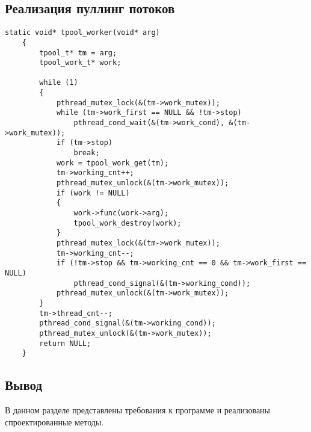 \subsection{Реализация пуллинг потоков}

\begin{lstlisting}[label=dbcreate, caption=Сокета poll]
    static void* tpool_worker(void* arg)
    {
        tpool_t* tm = arg;
        tpool_work_t* work;
    
        while (1)
        {
            pthread_mutex_lock(&(tm->work_mutex));
            while (tm->work_first == NULL && !tm->stop)
                pthread_cond_wait(&(tm->work_cond), &(tm->work_mutex));
            if (tm->stop)
                break;
            work = tpool_work_get(tm);
            tm->working_cnt++;
            pthread_mutex_unlock(&(tm->work_mutex));
            if (work != NULL)
            {
                work->func(work->arg);
                tpool_work_destroy(work);
            }
            pthread_mutex_lock(&(tm->work_mutex));
            tm->working_cnt--;
            if (!tm->stop && tm->working_cnt == 0 && tm->work_first == NULL)
                pthread_cond_signal(&(tm->working_cond));
            pthread_mutex_unlock(&(tm->work_mutex));
        }
        tm->thread_cnt--;
        pthread_cond_signal(&(tm->working_cond));
        pthread_mutex_unlock(&(tm->work_mutex));
        return NULL;
    }    
\end{lstlisting}


\subsection*{Вывод}

В данном разделе представлены требования к программе и реализованы спроектированные методы.